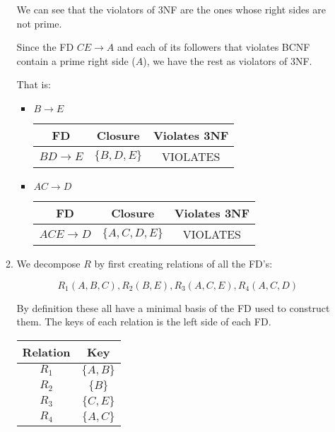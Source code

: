 \documentclass[12pt,letterpaper]{article}
\begin{document}
\begin{enumerate}
\begin{enumerate}
          We can see that the violators of 3NF are the ones whose right sides are not prime.

          Since the FD $CE \rightarrow A$ and each of its followers that violates BCNF contain a prime right side ($A$),
          we have the rest as violators of 3NF.

          That is:

          \begin{itemize}
            \item $B \rightarrow E$

              \begin{tabular}{c | c | c |}
                FD                    & Closure             & Violates 3NF \\
                \hline
                $BD \rightarrow E$    & $\{B, D, E\}$       & VIOLATES \\
                \hline
              \end{tabular}

            \item $AC \rightarrow D$

              \begin{tabular}{c | c | c |}
                FD                    & Closure             & Violates 3NF \\
                \hline
                $ACE \rightarrow D$   & $\{A, C, D, E\}$    & VIOLATES \\
                \hline
              \end{tabular}
          \end{itemize}

        \item
          We decompose $R$ by first creating relations of all the FD's:

          \[R_1(A, B, C), R_2(B, E), R_3(A, C, E), R_4(A, C, D)\]

          By definition these all have a minimal basis of the FD used to construct them.
          The keys of each relation is the left side of each FD.

          \begin{tabular}{c | c}
            Relation & Key \\
            \hline
            $R_1$    & $\{A, B\}$ \\
            $R_2$    & $\{B\}$ \\
            $R_3$    & $\{C, E\}$ \\
            $R_4$    & $\{A, C\}$ \\
          \end{tabular}


\end{enumerate}
\end{enumerate}
\end{document}
